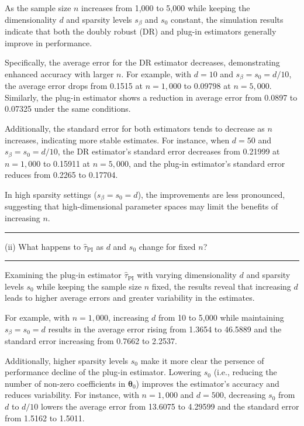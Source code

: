 \documentclass{article}
\newenvironment{colorparagraph}[1]{\par\color{#1}}{\par}
\begin{document}
As the sample size \( n \) increases from 1,000 to 5,000 while keeping the dimensionality \( d \) and sparsity levels \( s_\beta \) and \( s_0 \) constant, the simulation results indicate that both the doubly robust (DR) and plug-in estimators generally improve in performance.

Specifically, the average error for the DR estimator decreases, demonstrating enhanced accuracy with larger \( n \). For example, with \( d = 10 \) and \( s_\beta = s_0 = d/10 \), the average error drops from 0.1515 at \( n = 1,000 \) to 0.09798 at \( n = 5,000 \).
Similarly, the plug-in estimator shows a reduction in average error from 0.0897 to 0.07325 under the same conditions.

Additionally, the standard error for both estimators tends to decrease as \( n \) increases, indicating more stable estimates. For instance, when \( d = 50 \) and \( s_\beta = s_0 = d/10 \), the DR estimator's standard error decreases from 0.21999 at \( n = 1,000 \) to 0.15911 at \( n = 5,000 \), and the plug-in estimator's standard error reduces from 0.2265 to 0.17704.

In high sparsity settings (\( s_\beta = s_0 = d \)), the improvements are less pronounced, suggesting that high-dimensional parameter spaces may limit the benefits of increasing \( n \).

\begin{colorparagraph}{questioncolor}
  \rule{\textwidth}{0.5pt}
  
\vspace{.2cm}
(ii) What happens to \( \hat{\tau}_{\text{PI}} \) as \( d \) and \( s_0 \) change for fixed \( n \)?

\rule{\textwidth}{0.5pt}
\end{colorparagraph}

Examining the plug-in estimator \( \hat{\tau}_{\text{PI}} \) with varying dimensionality \( d \) and sparsity levels \( s_0 \) while keeping the sample size \( n \) fixed, the results reveal that increasing \( d \) leads to higher average errors and greater variability in the estimates.

For example, with \( n = 1,000 \), increasing \( d \) from 10 to 5,000 while maintaining \( s_\beta = s_0 = d \) results in the average error rising from 1.3654 to 46.5889 and the standard error increasing from 0.7662 to 2.2537.

Additionally, higher sparsity levels \( s_0 \) make it more clear the persence of performance decline of the plug-in estimator. Lowering \( s_0 \) (i.e., reducing the number of non-zero coefficients in \( \boldsymbol{\theta}_0 \)) improves the estimator's accuracy and reduces variability. For instance, with \( n = 1,000 \) and \( d = 500 \), decreasing \( s_0 \) from \( d \) to \( d/10 \) lowers the average error from 13.6075 to 4.29599 and the standard error from 1.5162 to 1.5011.
\end{document}
